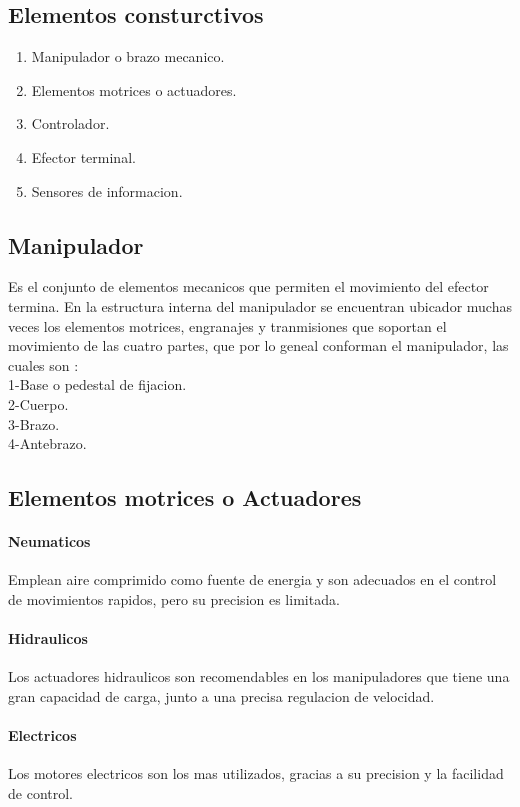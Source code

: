 \documentclass[14pt,a4paper]{article}
\begin{document}
\subsection{Elementos consturctivos}
\begin{enumerate}

\item Manipulador o brazo mecanico.\\
\item Elementos motrices o actuadores.\\
\item Controlador.\\
\item Efector terminal.\\
\item Sensores de informacion.
\end{enumerate}

\subsection{Manipulador}
Es el conjunto de elementos mecanicos que permiten el movimiento del efector termina. En la estructura interna del manipulador se encuentran ubicador muchas veces los elementos motrices, engranajes y tranmisiones que soportan el movimiento de las cuatro partes, que por lo geneal conforman el manipulador, las cuales son \citep{puglisi2006protesis}:\\
1-Base o pedestal de fijacion.\\
2-Cuerpo.\\
3-Brazo.\\
4-Antebrazo.\\
\subsection{Elementos motrices o Actuadores}
\paragraph{Neumaticos}
Emplean aire comprimido como fuente de energia y son adecuados en el control de movimientos rapidos, pero su precision es limitada.
\paragraph{Hidraulicos}
Los actuadores hidraulicos son recomendables en los manipuladores que tiene una gran capacidad de carga, junto a una precisa regulacion de velocidad.
\paragraph{Electricos}
Los motores electricos son los mas utilizados, gracias a su precision y la facilidad de control.
\end{document}
